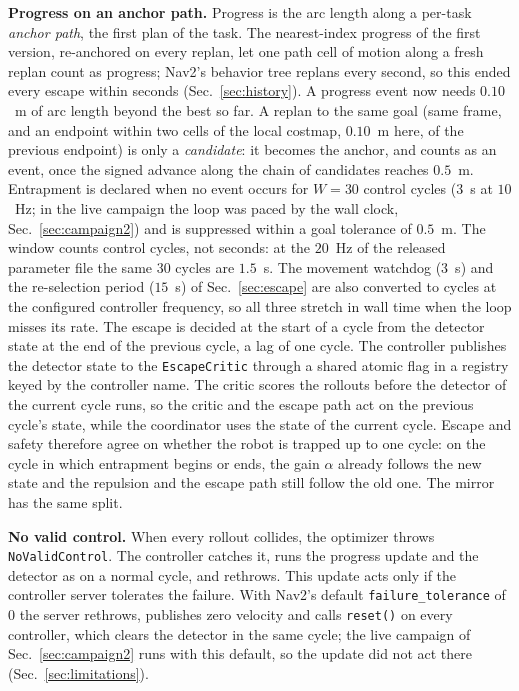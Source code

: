 \documentclass[journal]{IEEEtran}
\begin{document}
\textbf{Progress on an anchor path.} Progress is the arc length along a
per-task \emph{anchor path}, the first plan of the task. The nearest-index
progress of the first version, re-anchored on every replan, let one path
cell of motion along a fresh replan count as progress; Nav2's behavior tree
replans every second, so this ended every escape within seconds
(Sec.~\ref{sec:history}). A progress event now needs $0.10$~m of arc
length beyond the best so far. A replan to the same goal (same frame, and an endpoint within two
cells of the local costmap, $0.10$~m here, of the previous endpoint) is only a
\emph{candidate}: it becomes the anchor, and counts as an event, once the
signed advance along the chain of candidates reaches $0.5$~m. Entrapment is
declared when no event occurs for $W=30$ control cycles ($3$~s at $10$~Hz; in the live campaign
the loop was paced by the wall clock, Sec.~\ref{sec:campaign2})
and is suppressed within a goal tolerance of $0.5$~m. The window counts
control cycles, not seconds: at the $20$~Hz of the released parameter file the
same $30$ cycles are $1.5$~s. The movement watchdog ($3$~s) and the re-selection period
($15$~s) of Sec.~\ref{sec:escape} are also converted to cycles at the configured controller
frequency, so all three stretch in wall time when the loop misses its rate. The escape is decided
at the start of a cycle from the detector state at the end of the previous
cycle, a lag of one cycle. The controller publishes the detector state to the
\texttt{EscapeCritic} through a shared atomic flag in a registry keyed by the controller
name. The critic scores the rollouts before the detector of the current cycle runs, so the
critic and the escape path act on the previous cycle's state, while the coordinator uses the
state of the current cycle. Escape and safety therefore agree on whether the robot is
trapped up to one cycle: on the cycle in which entrapment begins or ends, the gain $\alpha$
already follows the new state and the repulsion and the escape path still follow the old
one. The mirror has the same split.

\textbf{No valid control.} When every rollout collides, the optimizer
throws \texttt{NoValidControl}. The controller catches it, runs the progress
update and the detector as on a normal cycle, and rethrows. This update
acts only if the controller server tolerates the failure. With Nav2's
default \texttt{failure\_tolerance} of $0$ the server rethrows, publishes
zero velocity and calls \texttt{reset()} on every controller, which clears
the detector in the same cycle; the live campaign of
Sec.~\ref{sec:campaign2} runs with this default, so the update did not act
there (Sec.~\ref{sec:limitations}).
\end{document}
